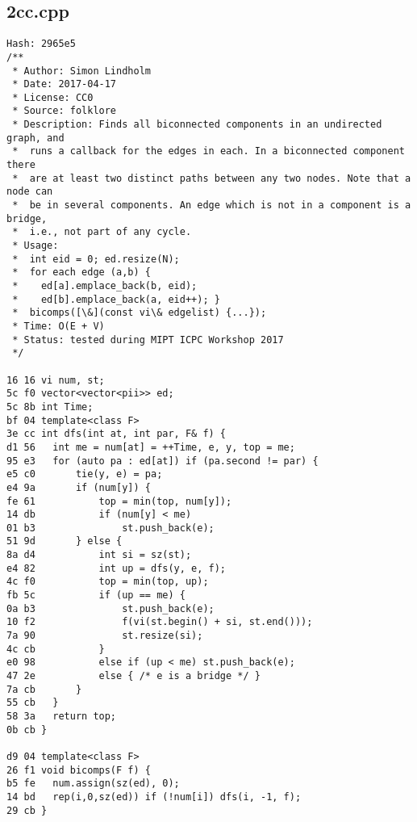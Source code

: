 \documentclass[11pt, a4paper, twoside]{article}
\begin{document}
\subsection{2cc.cpp}
\begin{lstlisting}
Hash: 2965e5
/**
 * Author: Simon Lindholm
 * Date: 2017-04-17
 * License: CC0
 * Source: folklore
 * Description: Finds all biconnected components in an undirected graph, and
 *  runs a callback for the edges in each. In a biconnected component there
 *  are at least two distinct paths between any two nodes. Note that a node can
 *  be in several components. An edge which is not in a component is a bridge,
 *  i.e., not part of any cycle.
 * Usage:
 *  int eid = 0; ed.resize(N);
 *  for each edge (a,b) {
 *    ed[a].emplace_back(b, eid);
 *    ed[b].emplace_back(a, eid++); }
 *  bicomps([\&](const vi\& edgelist) {...});
 * Time: O(E + V)
 * Status: tested during MIPT ICPC Workshop 2017
 */

16 16 vi num, st;
5c f0 vector<vector<pii>> ed;
5c 8b int Time;
bf 04 template<class F>
3e cc int dfs(int at, int par, F& f) {
d1 56 	int me = num[at] = ++Time, e, y, top = me;
95 e3 	for (auto pa : ed[at]) if (pa.second != par) {
e5 c0 		tie(y, e) = pa;
e4 9a 		if (num[y]) {
fe 61 			top = min(top, num[y]);
14 db 			if (num[y] < me)
01 b3 				st.push_back(e);
51 9d 		} else {
8a d4 			int si = sz(st);
e4 82 			int up = dfs(y, e, f);
4c f0 			top = min(top, up);
fb 5c 			if (up == me) {
0a b3 				st.push_back(e);
10 f2 				f(vi(st.begin() + si, st.end()));
7a 90 				st.resize(si);
4c cb 			}
e0 98 			else if (up < me) st.push_back(e);
47 2e 			else { /* e is a bridge */ }
7a cb 		}
55 cb 	}
58 3a 	return top;
0b cb }

d9 04 template<class F>
26 f1 void bicomps(F f) {
b5 fe 	num.assign(sz(ed), 0);
14 bd 	rep(i,0,sz(ed)) if (!num[i]) dfs(i, -1, f);
29 cb }
\end{lstlisting}
\end{document}
